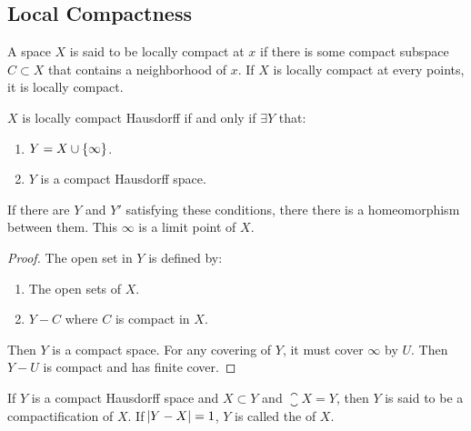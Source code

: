 \subsection{Local Compactness}

\begin{definition}
    A space $X$ is said to be locally compact at $x$ if there is some compact subspace $C \subset X$ that contains a neighborhood of $x$. If $X$ is locally compact at every points, it is locally compact.
\end{definition}


\begin{theorem}
    $X$ is locally compact Hausdorff if and only if $\exists Y$ that:
    \begin{enumerate}
        \item $Y = X \cup \set{\infty}$.
        \item $Y$ is a compact Hausdorff space.
    \end{enumerate}
    
    If there are $Y$ and $Y'$ satisfying these conditions, there there is a homeomorphism between them. This $\infty$ is a limit point of $X$.
\end{theorem}
\begin{proof}
    The open set in $Y$ is defined by:
    \begin{enumerate}
        \item The open sets of $X$.
        \item $Y -C$ where $C$ is compact in $X$.
    \end{enumerate}
    
    Then $Y$ is a compact space. For any covering of $Y$, it must cover $\infty$ by $U$. Then $Y-U$ is compact and has finite cover.
\end{proof}

\begin{definition}
    If $Y$ is a compact Hausdorff space and $X \subset Y$ and $\closure{X} = Y$, then $Y$ is said to be a compactification of $X$. If $\abs{Y - X} = 1$, $Y$ is called the  of $X$.
\end{definition}


